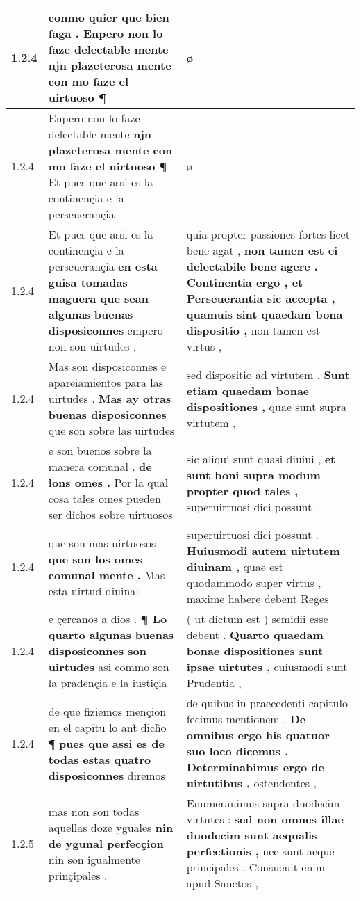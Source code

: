 \begin{tabular}{|p{1cm}|p{6.5cm}|p{6.5cm}|}
1.2.4 & conmo quier que bien faga . \textbf{ Enpero non lo faze delectable mente } njn plazeterosa mente con mo faze el uirtuoso ¶ & ø \\\hline
1.2.4 & Enpero non lo faze delectable mente \textbf{ njn plazeterosa mente con mo faze el uirtuoso ¶ } Et pues que assi es la continençia e la perseuerançia & ø \\\hline
1.2.4 & Et pues que assi es la continençia e la perseuerançia \textbf{ en esta guisa tomadas maguera que sean algunas buenas disposiconnes } empero non son uirtudes . & quia propter passiones fortes licet bene agat , \textbf{ non tamen est ei delectabile bene agere . Continentia ergo , et Perseuerantia sic accepta , quamuis sint quaedam bona dispositio , } non tamen est virtus , \\\hline
1.2.4 & Mas son disposiconnes e apareiamientos para las uirtudes . \textbf{ Mas ay otras buenas disposiconnes } que son sobre las uirtudes & sed dispositio ad virtutem . \textbf{ Sunt etiam quaedam bonae dispositiones , } quae sunt supra virtutem , \\\hline
1.2.4 & e son buenos sobre la manera comunal . \textbf{ de lons omes . } Por la qual cosa tales omes pueden ser dichos sobre uirtuosos & sic aliqui sunt quasi diuini , \textbf{ et sunt boni supra modum propter quod tales , } superuirtuosi dici possunt . \\\hline
1.2.4 & que son mas uirtuosos \textbf{ que son los omes comunal mente . } Mas esta uirtud diuinal & superuirtuosi dici possunt . \textbf{ Huiusmodi autem uirtutem diuinam , } quae est quodammodo super virtus , maxime habere debent Reges \\\hline
1.2.4 & e çercanos a dios . \textbf{ ¶ Lo quarto algunas buenas disposiconnes son uirtudes } asi commo son la pradençia e la iustiçia & ( ut dictum est ) semidii esse debent . \textbf{ Quarto quaedam bonae dispositiones sunt ipsae uirtutes , } cuiusmodi sunt Prudentia , \\\hline
1.2.4 & de que fiziemos mençion en el capitu lo ant̃ dich̃o ¶ \textbf{ pues que assi es de todas estas quatro disposiconnes } diremos & de quibus in praecedenti capitulo fecimus mentionem . \textbf{ De omnibus ergo his quatuor suo loco dicemus . Determinabimus ergo de uirtutibus , } ostendentes , \\\hline
1.2.5 & mas non son todas aquellas doze yguales \textbf{ nin de ygunal perfecçion } nin son igualmente prinçipales . & Enumerauimus supra duodecim virtutes : \textbf{ sed non omnes illae duodecim sunt aequalis perfectionis , } nec sunt aeque principales . Consueuit enim apud Sanctos , \\\hline

\end{tabular}
